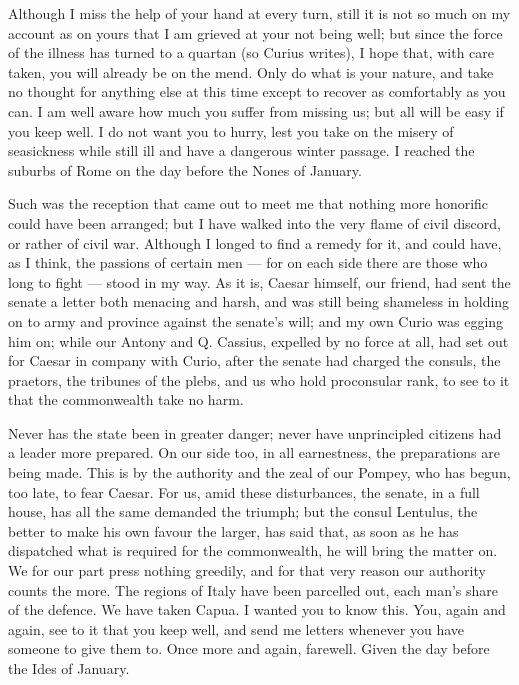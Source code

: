 

 Although I miss the help of your hand at every turn, still it is not so much on my account as on yours that I am grieved at your not being well; but since the force of the illness has turned to a quartan (so Curius writes), I hope that, with care taken, you will already be on the mend. Only do what is your nature, and take no thought for anything else at this time except to recover as comfortably as you can. I am well aware how much you suffer from missing us; but all will be easy if you keep well. I do not want you to hurry, lest you take on the misery of seasickness while still ill and have a dangerous winter passage. I reached the suburbs of Rome on the day before the Nones of January.

 Such was the reception that came out to meet me that nothing more honorific could have been arranged; but I have walked into the very flame of civil discord, or rather of civil war. Although I longed to find a remedy for it, and could have, as I think, the passions of certain men --- for on each side there are those who long to fight --- stood in my way. As it is, Caesar himself, our friend, had sent the senate a letter both menacing and harsh, and was still being shameless in holding on to army and province against the senate's will; and my own Curio was egging him on; while our Antony and Q. Cassius, expelled by no force at all, had set out for Caesar in company with Curio, after the senate had charged the consuls, the praetors, the tribunes of the plebs, and us who hold proconsular rank, to see to it that the commonwealth take no harm.

 Never has the state been in greater danger; never have unprincipled citizens had a leader more prepared. On our side too, in all earnestness, the preparations are being made. This is by the authority and the zeal of our Pompey, who has begun, too late, to fear Caesar. For us, amid these disturbances, the senate, in a full house, has all the same demanded the triumph; but the consul Lentulus, the better to make his own favour the larger, has said that, as soon as he has dispatched what is required for the commonwealth, he will bring the matter on. We for our part press nothing greedily, and for that very reason our authority counts the more. The regions of Italy have been parcelled out, each man's share of the defence. We have taken Capua. I wanted you to know this. You, again and again, see to it that you keep well, and send me letters whenever you have someone to give them to. Once more and again, farewell. Given the day before the Ides of January.
